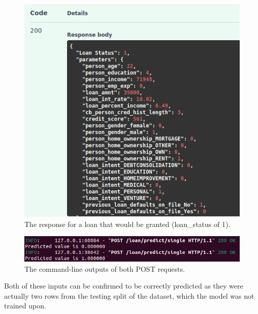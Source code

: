 \documentclass[12pt]{report}
\newcommand{\para}{\vspace{7pt}\noindent}
\begin{document}
\begin{figure}[H]
    \centering
    \includegraphics[width=\linewidth]{Implementation/FastAPI+Uvi/TruePositive.png}
    \caption{The response for a loan that would be granted (loan\_status of 1).}
    \label{fig:UviTruePositive}
\end{figure}

\begin{figure}[H]
    \centering
    \includegraphics[width=\linewidth]{Implementation/FastAPI+Uvi/TruePredictionsCLI.png}
    \caption{The command-line outputs of both POST requests.}
    \label{fig:UviCLI}
\end{figure}

\para Both of these inputs can be confirmed to be correctly predicted as they were actually two 
rows from the testing split of the dataset, which the model was not trained upon.
\end{document}
